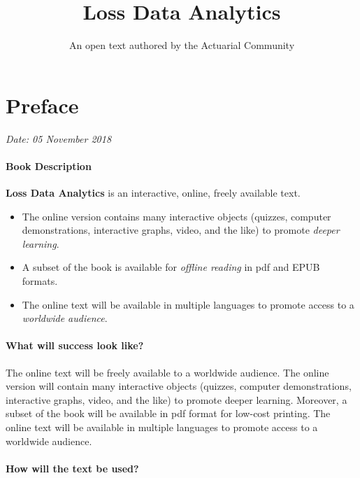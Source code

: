 \documentclass[]{book}
\title{Loss Data Analytics}
\author{An open text authored by the Actuarial Community}
\date{}
\providecommand{\tightlist}{%
  \setlength{\itemsep}{0pt}\setlength{\parskip}{0pt}}
\theoremstyle{definition}
\theoremstyle{definition}
\theoremstyle{definition}
\theoremstyle{remark}
\begin{document}
\maketitle

{
\setcounter{tocdepth}{2}
\tableofcontents
}
\chapter*{Preface}\label{preface}

\emph{Date: 05 November 2018}

\subsubsection*{Book Description}\label{book-description}

\textbf{Loss Data Analytics} is an interactive, online, freely available
text.

\begin{itemize}
\tightlist
\item
  The online version contains many interactive objects (quizzes,
  computer demonstrations, interactive graphs, video, and the like) to
  promote \emph{deeper learning}.
\item
  A subset of the book is available for \emph{offline reading} in pdf
  and EPUB formats.
\item
  The online text will be available in multiple languages to promote
  access to a \emph{worldwide audience}.
\end{itemize}

\subsubsection*{What will success look
like?}\label{what-will-success-look-like}

The online text will be freely available to a worldwide audience. The
online version will contain many interactive objects (quizzes, computer
demonstrations, interactive graphs, video, and the like) to promote
deeper learning. Moreover, a subset of the book will be available in pdf
format for low-cost printing. The online text will be available in
multiple languages to promote access to a worldwide audience.

\subsubsection*{How will the text be
used?}\label{how-will-the-text-be-used}
\end{document}
